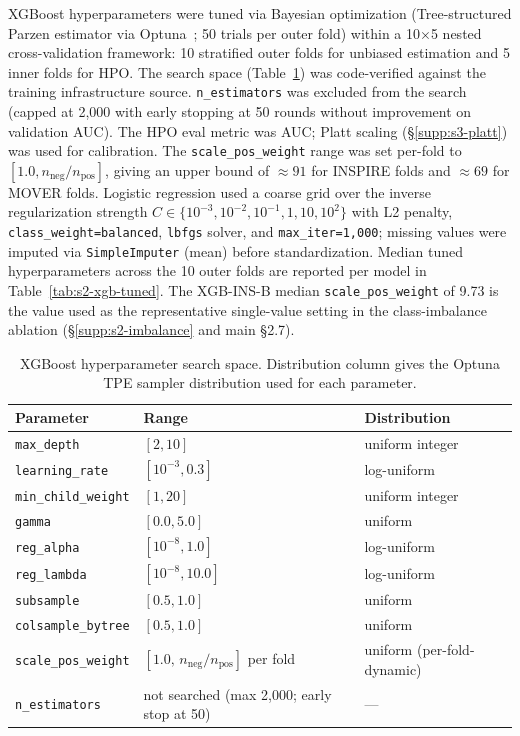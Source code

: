 \documentclass[11pt,a4paper]{article}
\providecommand{\bomark}{\bottomrule}
\begin{document}
XGBoost hyperparameters were tuned via Bayesian optimization (Tree-structured
Parzen estimator via Optuna~\cite{Akiba2019Optuna}; 50 trials per outer fold)
within a 10$\times$5 nested cross-validation framework: 10 stratified outer
folds for unbiased estimation and 5 inner folds for HPO. The search space
(Table~\ref{tab:s2-xgb-search}) was code-verified against the training
infrastructure source. \texttt{n\_estimators} was excluded
from the search (capped at 2{,}000 with early stopping at 50 rounds without
improvement on validation AUC). The HPO eval metric was AUC; Platt scaling
(\S\ref{supp:s3-platt}) was used for calibration. The \texttt{scale\_pos\_weight}
range was set per-fold to $[1.0, n_{\text{neg}}/n_{\text{pos}}]$,
giving an upper bound of $\approx 91$ for INSPIRE folds and
$\approx 69$ for MOVER folds. Logistic regression used a coarse grid over
the inverse regularization strength $C \in \{10^{-3}, 10^{-2}, 10^{-1}, 1, 10,
10^2\}$ with L2 penalty, \texttt{class\_weight=balanced}, \texttt{lbfgs}
solver, and \texttt{max\_iter=1{,}000}; missing values were imputed via
\texttt{SimpleImputer} (mean) before standardization. Median tuned
hyperparameters across the 10 outer folds are reported per model in
Table~\ref{tab:s2-xgb-tuned}. The XGB-INS-B median \texttt{scale\_pos\_weight}
of 9.73 is the value used as the representative single-value setting in the
class-imbalance ablation (\S\ref{supp:s2-imbalance} and main \S2.7).

\begin{table}[H]
\centering
\caption{XGBoost hyperparameter search space. Distribution column gives the Optuna TPE sampler distribution used for each parameter.}
\label{tab:s2-xgb-search}
\begin{tabular}{lll}
\toprule
\textbf{Parameter} & \textbf{Range} & \textbf{Distribution} \\
\midrule
\texttt{max\_depth} & $[2, 10]$ & uniform integer \\
\texttt{learning\_rate} & $[10^{-3}, 0.3]$ & log-uniform \\
\texttt{min\_child\_weight} & $[1, 20]$ & uniform integer \\
\texttt{gamma} & $[0.0, 5.0]$ & uniform \\
\texttt{reg\_alpha} & $[10^{-8}, 1.0]$ & log-uniform \\
\texttt{reg\_lambda} & $[10^{-8}, 10.0]$ & log-uniform \\
\texttt{subsample} & $[0.5, 1.0]$ & uniform \\
\texttt{colsample\_bytree} & $[0.5, 1.0]$ & uniform \\
\texttt{scale\_pos\_weight} & $[1.0,\, n_{\text{neg}}/n_{\text{pos}}]$ per fold & uniform (per-fold-dynamic) \\
\texttt{n\_estimators} & not searched (max 2{,}000; early stop at 50) & --- \\
\bomark
\end{tabular}
\end{table}
\end{document}
